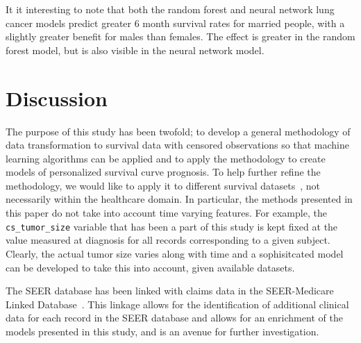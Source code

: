 \documentclass[10pt,letterpaper]{article}
\newcommand{\codewhite}[1]{\colorbox{white}{\texttt{#1}}}
\begin{document}
It it interesting to note that both the random forest and neural network lung cancer models predict greater 6 month survival rates for married people, with a slightly greater benefit for males than females. The effect is greater in the random forest model, but is also visible in the neural network model. 





\section{Discussion}
\label{sec:discussion}


The purpose of this study has been twofold; to develop a general methodology of data transformation to survival data with censored observations so that machine learning algorithms can be applied and to apply the methodology to create models of personalized survival curve prognosis.
To help further refine the methodology, we would like to apply it to different survival datasets~\cite{umass}, not necessarily within the healthcare domain. In particular, the methods presented in this paper do not take into account time varying features. For example, the \codewhite{cs\_tumor\_size} variable that has been a part of this study is kept fixed at the value measured at diagnosis for all records corresponding to a given subject. Clearly, the actual tumor size varies along with time and a sophisitcated model can be developed to take this into account, given available datasets.



The SEER database has been linked with claims data in the SEER-Medicare Linked Database~\cite{seermed}. This linkage allows for the identification of additional clinical data for each record in the SEER database and allows for an enrichment of the models presented in this study, and is an avenue for further investigation.
\end{document}
